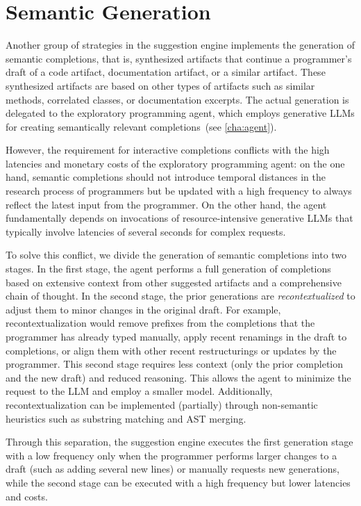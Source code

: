 
\section{Semantic Generation}
\label{sec:suggestions/generation}

Another group of strategies in the suggestion engine implements the generation of semantic completions, that is, synthesized artifacts that continue a programmer's draft of a code artifact, documentation artifact, or a similar artifact.
These synthesized artifacts are based on other types of artifacts such as similar methods, correlated classes, or documentation excerpts.
The actual generation is delegated to the exploratory programming agent, which employs generative LLMs for creating semantically relevant completions~(see \cref{cha:agent}).

However, the requirement for interactive completions conflicts with the high latencies and monetary costs of the exploratory programming agent:
on the one hand, semantic completions should not introduce temporal distances in the research process of programmers but be updated with a high frequency to always reflect the latest input from the programmer.
On the other hand, the agent fundamentally depends on invocations of resource-intensive generative LLMs that typically involve latencies of several seconds for complex requests.

To solve this conflict, we divide the generation of semantic completions into two stages.
In the first stage, the agent performs a full generation of completions based on extensive context from other suggested artifacts and a comprehensive chain of thought.
In the second stage, the prior generations are \emph{recontextualized} to adjust them to minor changes in the original draft.
For example, recontextualization would remove prefixes from the completions that the programmer has already typed manually, apply recent renamings in the draft to completions, or align them with other recent restructurings or updates by the programmer.
This second stage requires less context (only the prior completion and the new draft) and reduced reasoning.
This allows the agent to minimize the request to the LLM and employ a smaller model.
Additionally, recontextualization can be implemented (partially) through non-semantic heuristics such as substring matching and AST merging.

Through this separation, the suggestion engine executes the first generation stage with a low frequency only when the programmer performs larger changes to a draft (such as adding several new lines) or manually requests new generations, while the second stage can be executed with a high frequency but lower latencies and costs.
